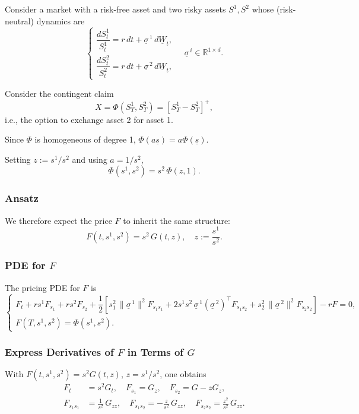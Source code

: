 \documentclass[12pt,a4paper]{article}
\theoremstyle{definition}
\newcommand{\R}{\mathbb{R}}
\begin{document}
Consider a market with a risk-free asset and two risky assets $S^1, S^2$ whose (risk-neutral) dynamics are
\[
\begin{cases}
\dfrac{dS_t^1}{S_t^1} = r \, dt + \underline{\sigma}^{\,1} \, d\underline{W}_t, \\[0.5em]
\dfrac{dS_t^2}{S_t^2} = r \, dt + \underline{\sigma}^{\,2} \, d\underline{W}_t,
\end{cases}
\quad \underline{\sigma}^{\,i} \in \R^{1 \times d}.
\]

Consider the contingent claim
\[
X = \Phi(S_T^1, S_T^2) = [S_T^1 - S_T^2]^+,
\]
i.e., the option to exchange asset 2 for asset 1.

Since $\Phi$ is homogeneous of degree 1, $\Phi(a\underline{s}) = a \Phi(\underline{s})$.

Setting $z := s^1 / s^2$ and using $a = 1/s^2$,
\[
\Phi(s^1, s^2) = s^2 \, \Phi(z, 1).
\]

\subsubsection{Ansatz}

We therefore expect the price $F$ to inherit the same structure:
\[
F(t, s^1, s^2) = s^2 \, G(t, z), \quad z := \frac{s^1}{s^2}.
\]

\subsubsection{PDE for $F$}

The pricing PDE for $F$ is
\[
\begin{cases}
F_t + r s^1 F_{s_1} + r s^2 F_{s_2} + \dfrac{1}{2} \left[s_1^2 \, \|\underline{\sigma}^{\,1}\|^2 F_{s_1 s_1} + 2 s^1 s^2 \, \underline{\sigma}^{\,1} (\underline{\sigma}^{\,2})^\top F_{s_1 s_2} + s_2^2 \, \|\underline{\sigma}^{\,2}\|^2 F_{s_2 s_2}\right] - r F = 0, \\[0.5em]
F(T, s^1, s^2) = \Phi(s^1, s^2).
\end{cases}
\]

\subsubsection{Express Derivatives of $F$ in Terms of $G$}

With $F(t, s^1, s^2) = s^2 G(t, z)$, $z = s^1/s^2$, one obtains
\[
\begin{aligned}
F_t &= s^2 G_t, \quad F_{s_1} = G_z, \quad F_{s_2} = G - z G_z, \\
F_{s_1 s_1} &= \frac{1}{s^2} \, G_{zz}, \quad F_{s_1 s_2} = -\frac{z}{s^2} \, G_{zz}, \quad F_{s_2 s_2} = \frac{z^2}{s^2} \, G_{zz}.
\end{aligned}
\]
\end{document}
